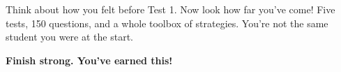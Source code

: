 {\begin{tcolorbox}[
    enhanced,
    colback=funYellowLight,
    colframe=funYellow!60,
    arc=10pt,
    boxrule=1pt,
    left=6mm, right=6mm, top=4mm, bottom=4mm,
]
\vspace{2mm}

Think about how you felt before Test 1. Now look how far you've come! Five tests, 150 questions, and a whole toolbox of strategies. You're not the same student you were at the start.
\end{tcolorbox}

\vspace{4mm}

\begin{center}
{\large\bfseries\color{funPinkDark} \faMedal\hspace{2mm}Finish strong. You've earned this!\hspace{2mm}\faMedal}
\end{center}

}
\newpage
